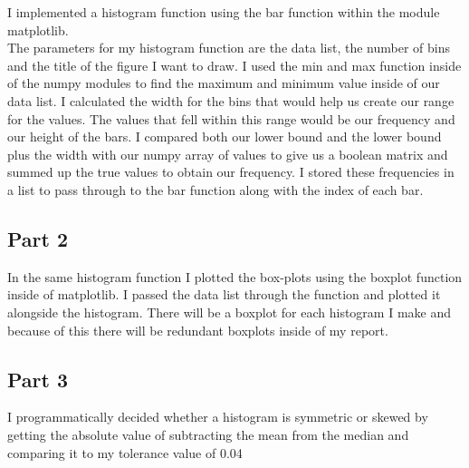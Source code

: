 \documentclass[11pt]{article}
\begin{document}
I implemented a histogram function using the bar function within the
module matplotlib.\\
The parameters for my histogram function are the data list, the number
of bins and the title of the figure I want to draw. I used the min and
max function inside of the numpy modules to find the maximum and minimum
value inside of our data list. I calculated the width for the bins that
would help us create our range for the values. The values that fell
within this range would be our frequency and our height of the bars. I
compared both our lower bound and the lower bound plus the width with
our numpy array of values to give us a boolean matrix and summed up the
true values to obtain our frequency. I stored these frequencies in a
list to pass through to the bar function along with the index of each
bar.

    \subsection{Part 2}\label{part-2}

In the same histogram function I plotted the box-plots using the boxplot
function inside of matplotlib. I passed the data list through the
function and plotted it alongside the histogram. There will be a boxplot
for each histogram I make and because of this there will be redundant
boxplots inside of my report.

    \subsection{Part 3}\label{part-3}

I programmatically decided whether a histogram is symmetric or skewed by
getting the absolute value of subtracting the mean from the median and
comparing it to my tolerance value of 0.04
\end{document}
